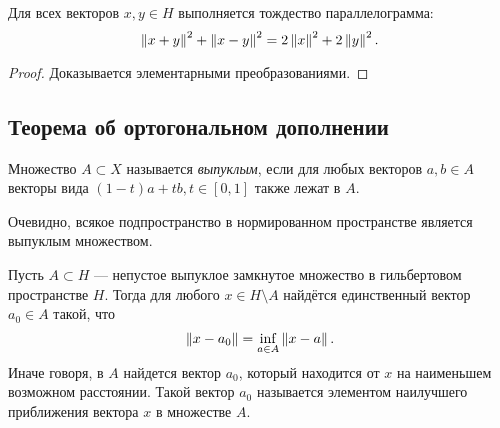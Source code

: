 \begin{theorem}
    Для всех векторов $x, y \in H$ выполняется тождество параллелограмма:
    \[ \left\|x + y\right\|^2 + \left\|x - y\right\|^2 = 2\left\|x\right\|^2 + 2\left\|y\right\|^2. \]
\end{theorem}

\begin{proof}
    Доказывается элементарными преобразованиями.
\end{proof}

\subsection{Теорема об ортогональном дополнении}
\begin{definition}
    Множество $A \subset X$ называется \emph{выпуклым}, если для любых векторов $a, b
    \in A$ векторы вида $(1-t) a + t b, t \in [0, 1]$ также лежат в $A$.
\end{definition}

Очевидно, всякое подпространство в нормированном пространстве является выпуклым
множеством.

\begin{theorem}
    Пусть $A \subset H$ --- непустое выпуклое замкнутое множество в гильбертовом пространстве $H$.
    Тогда для любого $x \in H \setminus A$ найдётся единственный вектор $a_0 \in
    A$ такой, что
    \[ \left\|x - a_0\right\| = \inf_{a \in A} \left\|x - a\right\|. \]
    Иначе говоря, в $A$ найдется вектор $a_0$, который находится от $x$ на наименьшем
    возможном расстоянии. Такой вектор $a_0$ называется элементом наилучшего
    приближения вектора $x$ в множестве $A$.
\end{theorem}

